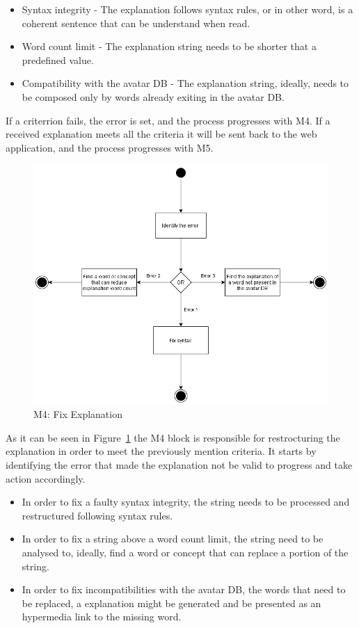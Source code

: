 \begin{itemize}
    \item Syntax integrity - The explanation follows syntax rules, or in other word, is a coherent sentence that can be understand when read.
    \item Word count limit - The explanation string needs to be shorter that a predefined value.
    \item Compatibility with the avatar \gls{DB} - The explanation string, ideally, needs to be composed only by words already exiting in the avatar \gls{DB}.
\end{itemize}

If a criterrion fails, the error is set, and the process progresses with M4.
If a received explanation meets all the criteria it will be sent back to the web application, and the process progresses with M5.

\begin{figure}[H]
\centering
\includegraphics[width=\textwidth,keepaspectratio]{ch4/assets/M4.png}
\caption[Fix Explanation Module]{M4: Fix Explanation}
\label{fig:M4}
\end{figure}

As it can be seen in Figure~\ref{fig:M4} the M4 block is responsible for restrocturing the explanation in order to meet the previously mention criteria.
It starts by identifying the error that made the explanation not be valid to progress and take action accordingly.

\begin{itemize}
    \item In order to fix a faulty syntax integrity, the string needs to be processed and restructured following syntax rules.
    \item In order to fix a string above a word count limit, the string need to be analysed to, ideally, find a word or concept that can replace a portion of the string.
    \item In order to fix incompatibilities with the avatar \gls{DB}, the words that need to be replaced, a explanation might be generated and be presented as an hypermedia link to the missing word.
\end{itemize}

